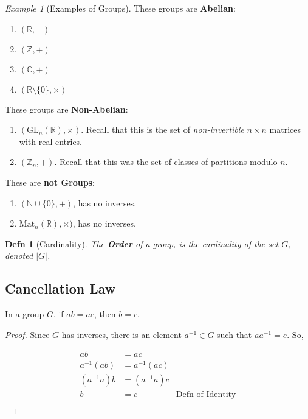 \documentclass[12pt]{article}
\def\mat{\text{Mat}}
\def\gl{\text{GL}}
\def\N{{\mathbb N}}
\def\Z{{\mathbb Z}}
\def\R{{\mathbb R}}
\def\C{{\mathbb C}}
\newtheorem{definition}{Defn}
\theoremstyle{remark}
\theoremstyle{remark}
\theoremstyle{remark}
\newtheorem{example}{Example}
\theoremstyle{remark}
\theoremstyle{remark}
\begin{document}
\begin{example}[Examples of Groups]
	These groups are {\bf Abelian}:
	\begin{enumerate}
		\item $(\R, +)$
		\item $(\Z, +)$
		\item $(\C, +)$
		\item $(\R \setminus \{0\}, \times)$
	\end{enumerate}

	These groups are {\bf Non-Abelian}:
	\begin{enumerate}
		\item $(\gl_n(\R), \times)$. Recall that this is the set of {\it
				      non-invertible} $n \times n$ matrices with real entries.
		\item $(\Z_n, +)$. Recall that this was the set of classes of partitions
		      modulo $n$.
	\end{enumerate}

	These are {\bf not Groups}:
	\begin{enumerate}
		\item $(\N \cup \{0\}, +)$, has no inverses.
		\item $\mat_n(\R), \times)$, has no inverses.
	\end{enumerate}
\end{example}

\begin{definition}[Cardinality]
	The {\bf Order} of a group, is the {\it cardinality} of the set $G$, denoted $|G|$.
\end{definition}

\subsection{Cancellation Law}

In a group $G$, if $ab = ac$, then $b = c$.

\begin{proof}
  Since $G$ has inverses, there is an element $a^{-1} \in G$ such that $a a^{-1} =
    e$. So,

  \begin{align*}
    ab          & = ac                                    \\
    a^{-1} (ab) & = a^{-1} (ac)                           \\
    (a^{-1}a) b & = (a^{-1}a) c                           \\
    b           & = c           & \text{Defn of Identity} \\
  \end{align*}
\end{proof}
\end{document}
